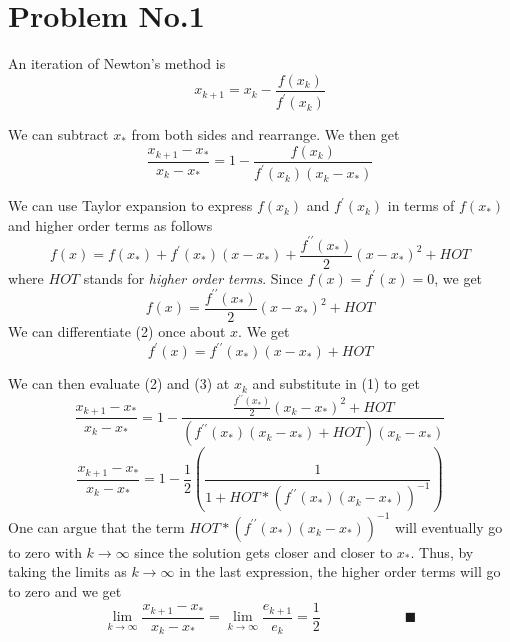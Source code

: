 \section*{Problem No.1} \label{sec:prob1}

An iteration of Newton's method is 
\[
x_{k+1} = x_{k} - \frac{f(x_{k})}{f^{\prime}(x_{k})} 
\]

We can subtract $x_{*}$ from both sides and rearrange. We then get
\begin{equation}
\frac{x_{k+1} -x_{*}}{x_{k} -x_{*}} = 1 - \frac{f(x_{k})}{f^{\prime}(x_{k}) (x_{k}-x_{*})} 
\end{equation}


We can use Taylor expansion to express $f(x_{k})$ and $f^{\prime}(x_{k})$ in terms of $f(x_{*})$ and higher order terms as follows
\[
f(x) = f(x_{*}) + f^{\prime}(x_{*})(x-x_{*}) + \frac{f^{\prime \prime}(x_{*})}{2}(x-x_{*})^{2}+HOT 
\] 
where $HOT$ stands for \emph{higher order terms}. Since $f(x)=f^{\prime}(x)=0$, we get
\begin{equation}
f(x) = \frac{f^{\prime \prime}(x_{*})}{2}(x-x_{*})^{2}+HOT
\end{equation}
We can differentiate (2) once about $x$. We get
\begin{equation}
f^{\prime}(x) = f^{\prime \prime}(x_{*})(x-x_{*})+HOT
\end{equation}

We can then evaluate (2) and (3) at $x_{k}$ and substitute in (1) to get
\[
\frac{x_{k+1} -x_{*}}{x_{k} -x_{*}} = 1 - \frac{  \frac{f^{\prime \prime}(x_{*})}{2}(x_{k}-x_{*})^{2}+HOT }{ (f^{\prime \prime}(x_{*})(x_{k}-x_{*})+HOT) (x_{k}-x_{*})}
\]
\[
\frac{x_{k+1} -x_{*}}{x_{k} -x_{*}} = 1 - \frac{1}{2} \left( \frac{1}{1 + HOT*(f^{\prime \prime}(x_{*})(x_{k}-x_{*}))^{-1}}\right)
\]
One can argue that the term $HOT*(f^{\prime \prime}(x_{*})(x_{k}-x_{*}))^{-1}$ will eventually go to zero with $k \to \infty$ since the solution gets closer and closer to $x_{*}$. Thus, by taking the limits as $k\rightarrow \infty$ in the last expression, the higher order terms will go to zero and we get 
$$
\lim_{k \to \infty} \frac{x_{k+1} -x_{*}}{x_{k} -x_{*}} = \lim_{k \to \infty} \frac{e_{k+1}}{e_{k}} = \frac{1}{2} \qquad \qquad \qquad \blacksquare
$$